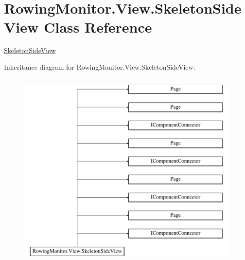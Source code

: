 \hypertarget{class_rowing_monitor_1_1_view_1_1_skeleton_side_view}{}\section{Rowing\+Monitor.\+View.\+Skeleton\+Side\+View Class Reference}
\label{class_rowing_monitor_1_1_view_1_1_skeleton_side_view}


\hyperlink{class_rowing_monitor_1_1_view_1_1_skeleton_side_view}{Skeleton\+Side\+View}  


Inheritance diagram for Rowing\+Monitor.\+View.\+Skeleton\+Side\+View\+:\begin{figure}[H]
\begin{center}
\leavevmode
\includegraphics[height=10.000000cm]{class_rowing_monitor_1_1_view_1_1_skeleton_side_view}
\end{center}
\end{figure}

